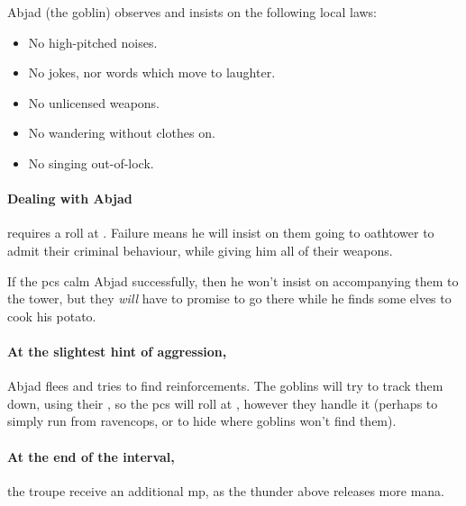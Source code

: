 \begin{multicols}{2}
Abjad (the goblin) observes and insists on the following local laws:

\begin{itemize}
  \item
  No high-pitched noises.
  \item
  No jokes, nor words which move to laughter.
  \item
  No unlicensed weapons.
  \item
  No wandering without clothes on.
  \item
  No singing out-of-lock.
\end{itemize}


\paragraph{Dealing with Abjad}
requires a  roll at \tn[9].
Failure means he will insist on them going to \gls{oathtower} to admit their criminal behaviour, while giving him all of their \glspl{weapon}.

If the \glspl{pc} calm Abjad successfully, then he won't insist on accompanying them to the tower, but they \emph{will} have to promise to go there while he finds some elves to cook his potato.

\paragraph{At the slightest hint of aggression,}
Abjad flees and tries to find reinforcements.
The goblins will try to track them down, using their , so the \glspl{pc} will roll at \tn, however they handle it (perhaps  to simply run from \gls{ravencops}, or  to hide where goblins won't find them).

\paragraph{At the end of the \gls{interval},}
the troupe receive an additional \gls{mp}, as the thunder above releases more mana.


\end{multicols}

\stopcontents[sq]
